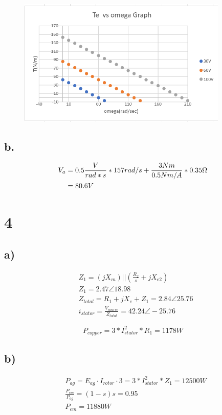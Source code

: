 \documentclass{article}
\begin{document}
    \begin{figure}[H]
        \centering
        \includegraphics[width=10cm]{figures/t_omega.PNG}
        \label{fig:t_omega}
    \end{figure}
    \subsection*{b.}
    \begin{align*}
        V_{a} &= 0.5\frac{V}{rad*s}*157rad/s + \frac{3 Nm}{0.5 Nm/A}*0.35\ohm\\
        &= 80.6V
    \end{align*}

    \section*{4}
    \subsection*{a)}
    \begin{align*}
        &Z_{1} = (j X_{m}) || (\frac{R_{2}}{s} + j X_{e2})\\
        &Z_{1} = 2.47 \angle 18.98\\
        &Z_{total} = R_{1} + jX_{e} + Z_{1} = 2.84\angle 25.76\\
        &i_{stator} = \frac{V_{source}}{Z_{total}} = \boxed{42.24\angle -25.76}
    \end{align*}

    \begin{equation*}
        P_{copper} = 3 * I_{stator}^{2} * R_{1} = \boxed{1178W}
    \end{equation*}

    \subsection*{b)}
    \begin{align*}
        &P_{ag} = E_{ag} \cdot I_{rotor} \cdot 3 = 3 * I_{stator}^{2} * Z_{1} = \boxed{12500W}\\
        &\frac{P_{em}}{P_{ag}} = (1-s)s = 0.95\\
        &\boxed{P_{em} = 11880W}
    \end{align*}
\end{document}
